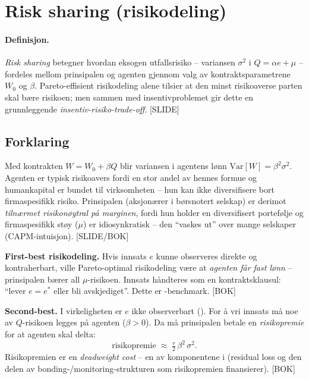 \section{Risk sharing (risikodeling)}\label{thr:risk-sharing}

\paragraph{Definisjon.} \emph{Risk sharing} betegner hvordan eksogen utfallsrisiko -- variansen $\sigma^{2}$ i $Q=\alpha e+\mu$ -- fordeles mellom prinsipalen og agenten gjennom valg av kontraktsparametrene $W_0$ og $\beta$. Pareto-effisient risikodeling alene tilsier at den minst risikoaverse parten skal bære risikoen; men sammen med insentivproblemet gir dette en grunnleggende \emph{insentiv-risiko-trade-off}. [SLIDE]

\subsection*{Forklaring}

Med kontrakten $W=W_0+\beta Q$ blir variansen i agentens lønn $\mathrm{Var}[W]=\beta^{2}\sigma^{2}$. Agenten er typisk risikoavers fordi en stor andel av hennes formue og humankapital er bundet til virksomheten -- hun kan ikke diversifisere bort firmaspesifikk risiko. Prinsipalen (aksjonærer i børsnotert selskap) er derimot \emph{tilnærmet risikonøytral på marginen}, fordi hun holder en diversifisert portefølje og firmaspesifikk støy ($\mu$) er idiosynkratisk -- den ``vaskes ut'' over mange selskaper (CAPM-intuisjon). [SLIDE/BOK]

\textbf{First-best risikodeling.} Hvis innsats $e$ kunne observeres direkte og kontraherbart, ville Pareto-optimal risikodeling være at \emph{agenten får fast lønn} -- prinsipalen bærer all $\mu$-risikoen. Innsats håndteres som en kontraktsklausul: ``lever $e=e^{*}$ eller bli avskjediget''. Dette er -benchmark. [BOK]

\textbf{Second-best.} I virkeligheten er $e$ ikke observerbart (). For å vri innsats må noe av $Q$-risikoen legges på agenten ($\beta>0$). Da må prinsipalen betale en \emph{risikopremie} for at agenten skal delta:
\[
\text{risikopremie}\;\approx\;\tfrac{r}{2}\,\beta^{2}\,\sigma^{2}.
\]
Risikopremien er en \emph{deadweight cost} -- en av komponentene i  (residual loss og den delen av bonding-/monitoring-strukturen som risikopremien finansierer). [BOK]

